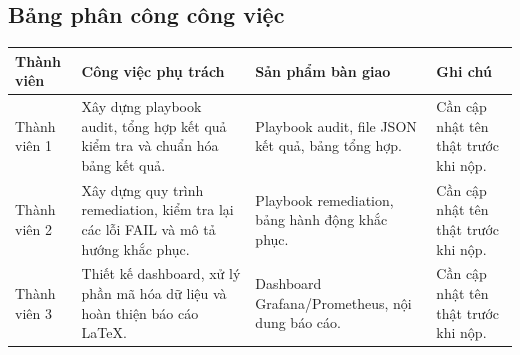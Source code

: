 \subsection{Bảng phân công công việc}\label{bang-phan-cong-cong-viec}

{\def\LTcaptype{none}
\begin{center}
\label{tab:bang-phan-cong-cong-viec}
\end{center}
\begin{longtable}[]{@{}|
  >{\raggedright\arraybackslash}p{}|
  >{\raggedright\arraybackslash}p{}|
  >{\raggedright\arraybackslash}p{}|
  >{\raggedright\arraybackslash}p{}|@{}}
\hline
\begin{minipage}[b]{\linewidth}\raggedright
\textbf{Thành viên}
\end{minipage} & \begin{minipage}[b]{\linewidth}\raggedright
\textbf{Công việc phụ trách}
\end{minipage} & \begin{minipage}[b]{\linewidth}\raggedright
\textbf{Sản phẩm bàn giao}
\end{minipage} & \begin{minipage}[b]{\linewidth}\raggedright
\textbf{Ghi chú}
\end{minipage} \\
\hline
\endhead
Thành viên 1 & Xây dựng playbook audit, tổng hợp kết quả kiểm tra và chuẩn hóa bảng kết quả. & Playbook audit, file JSON kết quả, bảng tổng hợp. & Cần cập nhật tên thật trước khi nộp. \\
\hline
Thành viên 2 & Xây dựng quy trình remediation, kiểm tra lại các lỗi FAIL và mô tả hướng khắc phục. & Playbook remediation, bảng hành động khắc phục. & Cần cập nhật tên thật trước khi nộp. \\
\hline
Thành viên 3 & Thiết kế dashboard, xử lý phần mã hóa dữ liệu và hoàn thiện báo cáo LaTeX. & Dashboard Grafana/Prometheus, nội dung báo cáo. & Cần cập nhật tên thật trước khi nộp. \\
\hline
\end{longtable}
}

